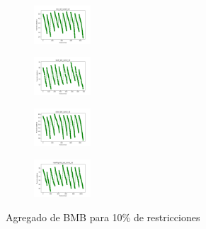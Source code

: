 \begin{figure}[H]
\begin{subfigure}
        \centering
        \includegraphics[width=0.234\textwidth]{img/bmb/iris_set_const_10_3773969821_cost.png}
    \end{subfigure}
    \hfill
    \begin{subfigure}
        \centering
        \includegraphics[width=0.234\textwidth]{img/bmb/ecoli_set_const_10_3773969821_cost.png}
    \end{subfigure}
    \hfill
    \begin{subfigure}
        \centering
        \includegraphics[width=0.234\textwidth]{img/bmb/rand_set_const_10_3773969821_cost.png}
    \end{subfigure}
    \hfill
    \begin{subfigure}
        \centering
        \includegraphics[width=0.234\textwidth]{img/bmb/newthyroid_set_const_10_3773969821_cost.png}
    \end{subfigure}
    \caption{Agregado de BMB para 10\% de restricciones}
\end{figure}


\vspace*{\fill}
\newpage
\vspace*{\fill}

